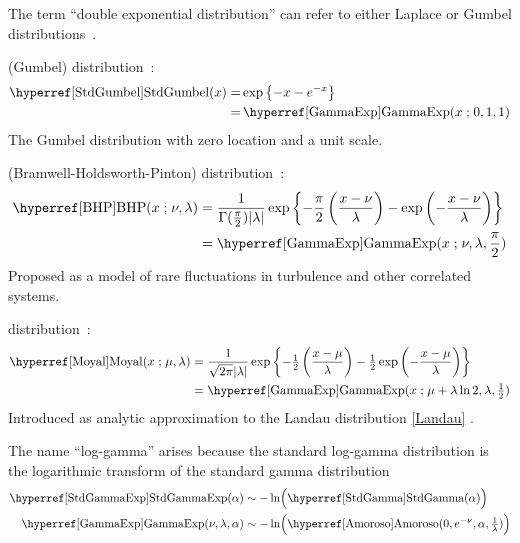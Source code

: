The term ``double exponential distribution'' can refer to either Laplace or Gumbel distributions~\cite{Johnson1995}.


 (Gumbel) distribution~\cite{Gumbel1958}:
\begin{align}
\label{StdGumbel}
\opr{StdGumbel}(x) 
=&
  \exp\left\{- x - e^{-x} \right\}  \checked \\
=& \opr{GammaExp}(x\given 0,1,1)  \notag \checked
\end{align}
The Gumbel distribution with zero location and a unit scale.



 (Bramwell-Holdsworth-Pinton) distribution~\cite{Bramwell1998, Bramwell2000}:
\begin{align}
\label{BHP}
\opr{BHP}(x\given \nu,\lambda) 
&=
\frac{1}{\Gamma(\tfrac{\pi}{2}) |\lambda|}  \exp\left\{ - \frac{\pi}{2}\left(\frac{x-\nu}{\lambda}\right) -  \exp\left(-\frac{x-\nu}{\lambda}\right)  \right\}  \checked
\notag
\\
&= \opr{GammaExp}(x\given \nu,\lambda,\frac{\pi}{2})   \checked
\end{align}
Proposed as a model of rare fluctuations in turbulence and other correlated systems.


 distribution~\cite{Moyal1955}:
\begin{align}
\label{Moyal}
\opr{Moyal}(x\given \mu, \lambda) & = 
\frac{1}{\sqrt{2\pi}  |\lambda|}  \exp\left\{- \half \left(\frac{x-\mu}{\lambda}\right) - \half \exp\left(- \frac{x-\mu}{\lambda}\right)  \right\} \checked
\\
&= \opr{GammaExp}(x\given \mu+ \lambda \ln 2, \lambda ,\half)  \checked
\notag
\end{align}
Introduced as analytic approximation to the  Landau distribution \eqref{Landau} \cite{Moyal1955}.




The name ``log-gamma'' arises because the standard log-gamma distribution is the logarithmic transform of the standard gamma distribution
\begin{align*}
\opr{StdGammaExp}(\alpha)  &\sim - \ln\Bigl( \opr{StdGamma}(\alpha) \Bigr) \checked
\\
\opr{GammaExp}(\nu, \lambda, \alpha)  &\sim -\ln\Bigl( \opr{Amoroso}(0, e^{-\nu},\alpha, \tfrac{1}{\lambda}) \Bigr) \checked
\end{align*}


